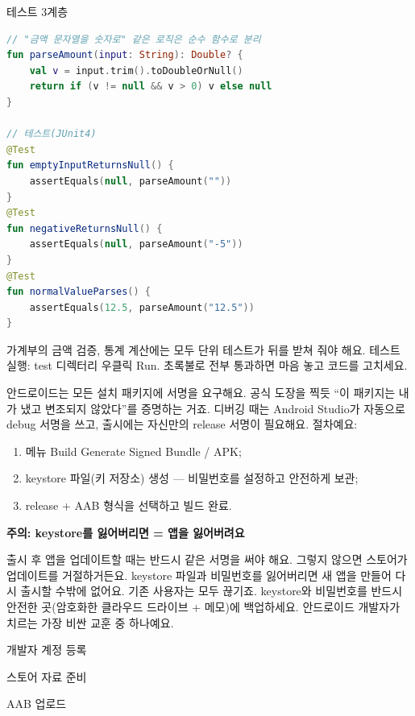 \begin{center}\small\color{gray}테스트 3계층\end{center}

\begin{lstlisting}[language=Kotlin]
// "금액 문자열을 숫자로" 같은 로직은 순수 함수로 분리
fun parseAmount(input: String): Double? {
    val v = input.trim().toDoubleOrNull()
    return if (v != null && v > 0) v else null
}

// 테스트(JUnit4)
@Test
fun emptyInputReturnsNull() {
    assertEquals(null, parseAmount(""))
}
@Test
fun negativeReturnsNull() {
    assertEquals(null, parseAmount("-5"))
}
@Test
fun normalValueParses() {
    assertEquals(12.5, parseAmount("12.5"))
}
\end{lstlisting}

가계부의 금액 검증, 통계 계산에는 모두 단위 테스트가 뒤를 받쳐 줘야 해요. 테스트 실행: test 디렉터리 우클릭 Run. 초록불로 전부 통과하면 마음 놓고 코드를 고치세요.


안드로이드는 모든 설치 패키지에 서명을 요구해요. 공식 도장을 찍듯 “이 패키지는 내가 냈고 변조되지 않았다”를 증명하는 거죠. 디버깅 때는 Android Studio가 자동으로 debug 서명을 쓰고, 출시에는 자신만의 release 서명이 필요해요. 절차예요:

\begin{enumerate}
  \item 메뉴 Build Generate Signed Bundle / APK;
  \item keystore 파일(키 저장소) 생성 — 비밀번호를 설정하고 안전하게 보관;
  \item release + AAB 형식을 선택하고 빌드 완료.
\end{enumerate}

\textbf{주의: keystore를 잃어버리면 = 앱을 잃어버려요}\par

출시 후 앱을 업데이트할 때는 반드시 같은 서명을 써야 해요. 그렇지 않으면 스토어가 업데이트를 거절하거든요. keystore 파일과 비밀번호를 잃어버리면 새 앱을 만들어 다시 출시할 수밖에 없어요. 기존 사용자는 모두 끊기죠. keystore와 비밀번호를 반드시 안전한 곳(암호화한 클라우드 드라이브 + 메모)에 백업하세요. 안드로이드 개발자가 치르는 가장 비싼 교훈 중 하나예요.


개발자 계정 등록

스토어 자료 준비

AAB 업로드

